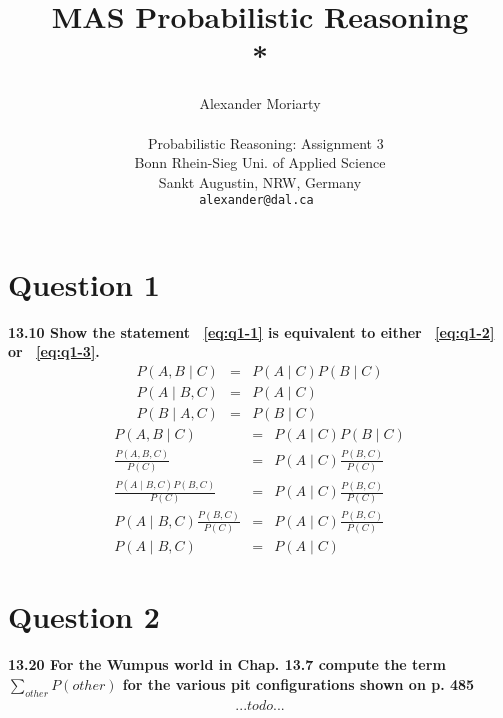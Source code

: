 \documentclass[a4paper, 12 pt, conference, onecolumn]{IEEEconf}
\title{\LARGE \bf
MAS Probabilistic Reasoning\\* 
}
\author{Alexander Moriarty\\~\\~
        Probabilistic Reasoning: Assignment 3\\
        Bonn Rhein-Sieg Uni. of Applied Science\\ 
        Sankt Augustin, NRW, Germany\\
        \tt\small alexander@dal.ca
}
\begin{document}
\maketitle

\section{Question 1}
\textbf{13.10 Show the statement ~\ref{eq:q1-1} is equivalent to either ~\ref{eq:q1-2} or ~\ref{eq:q1-3}.}
\begin{eqnarray}
P(A, B \mid C) &=& P(A \mid C) P(B \mid C) \label{eq:q1-1} \\
P(A \mid B, C) &=& P(A \mid C) \label{eq:q1-2} \\
P(B \mid A, C) &=& P(B \mid C) \label{eq:q1-3}
\end{eqnarray}
\noindent\makebox[\linewidth]{\rule{\linewidth}{0.1pt}} 
\setcounter{equation}{0}
\begin{eqnarray}
P(A, B \mid C) &=& P(A \mid C) P(B \mid C) \\
\frac{P(A, B, C)}{P(C)} &=& P(A \mid C)\frac{P(B, C)}{P(C)} \\
\frac{P(A \mid B, C) P(B, C)}{P(C)} &=& P(A \mid C)\frac{P(B, C)}{P(C)} \\
P(A \mid B, C)\frac{P(B, C)}{P(C)} &=& P(A \mid C)\frac{P(B, C)}{P(C)} \\
P(A \mid B, C) &=& P(A \mid C)
\end{eqnarray}


\setcounter{paragraph}{0}
\setcounter{equation}{0}
\section{Question 2}
\textbf{13.20 For the Wumpus world in Chap. 13.7 compute the term $\sum\limits_{other}P(other)$ for the various pit configurations shown on p. 485}
\begin{eqnarray}
... todo ...
\end{eqnarray}
\end{document}
